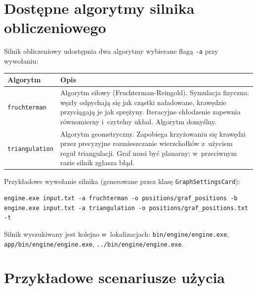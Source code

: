 \documentclass[12pt,a4paper]{article}
\begin{document}
\section{Dostępne algorytmy silnika obliczeniowego}

Silnik obliczeniowy udostępnia dwa algorytmy wybierane flagą \texttt{-a} przy wywołaniu:

\begin{center}
\renewcommand{\arraystretch}{1.5}
\begin{tabular}{>{\raggedright\arraybackslash}p{3.5cm} >{\raggedright\arraybackslash}p{10cm}}
\toprule
\textbf{Algorytm} & \textbf{Opis} \\
\midrule
\texttt{fruchterman} & Algorytm siłowy (Fruchterman-Reingold). Symulacja fizyczna: węzły odpychają się jak cząstki naładowane, krawędzie przyciągają je jak sprężyny. Iteracyjne chłodzenie zapewnia równomierny i~czytelny układ. Algorytm domyślny. \\
\addlinespace
\texttt{triangulation} & Algorytm geometryczny. Zapobiega krzyżowaniu się krawędzi przez precyzyjne rozmieszczanie wierzchołków z~użyciem reguł triangulacji. Graf musi być planarny; w~przeciwnym razie silnik zgłasza błąd. \\
\bottomrule
\end{tabular}
\end{center}

\vspace{0.3cm}
Przykładowe wywołanie silnika (generowane przez klasę \texttt{GraphSettingsCard}):
\begin{lstlisting}
engine.exe input.txt -a fruchterman -o positions/graf_positions -b
engine.exe input.txt -a triangulation -o positions/graf_positions.txt -t
\end{lstlisting}

Silnik wyszukiwany jest kolejno w~lokalizacjach: \texttt{bin/engine/engine.exe}, \texttt{app/bin/engine/engine.exe}, \texttt{../bin/engine/engine.exe}.

\section{Przykładowe scenariusze użycia}
\end{document}
